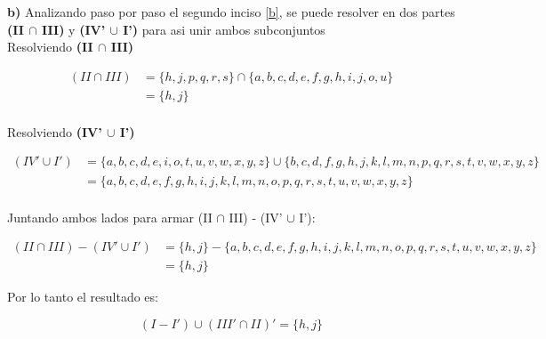 \newpage

%
\textbf{b)} Analizando paso por paso el segundo inciso \ref{b}, se puede resolver en dos partes \textbf{(II $\cap$ III)} y \textbf{(IV' $\cup$ I')} para asi unir ambos subconjuntos \\

Resolviendo \textbf{(II $\cap$ III)}

\begin{align*}
(II \cap III)  &= \{ h, j, p, q, r, s  \} \cap \{ a, b, c, d, e, f, g, h, i, j, o, u  \}  \\
  &=   \{ h, j  \}      \\
\end{align*}

Resolviendo \textbf{(IV' $\cup$ I')}

\begin{align*}
(IV' \cup I')  &=  \{ a, b, c, d, e, i, o, t, u, v, w, x, y, z \}  \cup \{ b, c, d, f, g, h, j, k, l, m, n, p, q, r, s, t, v, w, x, y, z \}  \\
  &=  \{ a, b, c, d, e, f, g, h, i, j, k, l, m, n, o, p, q, r, s, t, u, v, w, x, y, z \} \\
\end{align*}

Juntando ambos lados para armar (II $\cap$ III) - (IV' $\cup$ I'):

\begin{align*}
(II \cap III) - (IV' \cup I') &= \{ h, j  \} - \{ a, b, c, d, e, f, g, h, i, j, k, l, m, n, o, p, q, r, s, t, u, v, w, x, y, z \} \\
  &= \{ h, j \} 
\end{align*}

Por lo tanto el resultado es:

\begin{equation*}
    \boxed{(I - I') \cup (III' \cap II)' = \{ h, j \} }
\end{equation*}